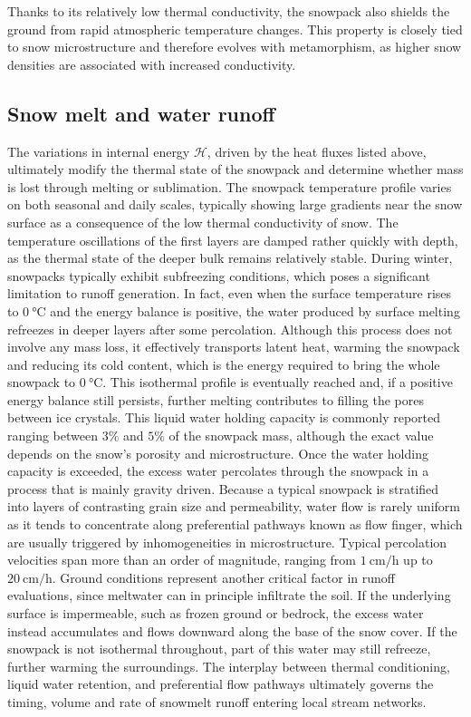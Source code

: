 Thanks to its relatively low thermal conductivity, the snowpack also shields the ground from rapid atmospheric temperature changes. This property is 
closely tied to snow microstructure and therefore evolves with metamorphism, as higher snow densities are associated with increased conductivity. 



\subsection{Snow melt and water runoff}

The variations in internal energy $\mathcal{H}$, driven by the heat fluxes listed above, ultimately modify the thermal state of the 
snowpack and determine whether mass is lost through melting or sublimation. The snowpack temperature profile varies on both seasonal and daily scales, 
typically showing large gradients near the snow surface as a consequence of the low thermal conductivity of snow. The temperature oscillations of 
the first layers are damped rather quickly with depth, as the thermal state of the deeper bulk remains relatively stable. During winter, snowpacks 
typically exhibit subfreezing conditions, which poses a significant limitation to runoff generation. In fact, even when the surface temperature rises 
to $\SI{0}{\degreeCelsius}$ and the energy balance is positive, the water produced by surface melting refreezes in deeper layers after some percolation. 
Although this process does not involve any mass loss, it effectively transports latent heat, warming the snowpack and reducing its cold content, which is 
the energy required to bring the whole snowpack to $\SI{0}{\degreeCelsius}$. This isothermal profile is eventually reached and, if a positive energy 
balance still persists, further melting contributes to filling the pores between ice crystals. This liquid water holding capacity is commonly reported 
ranging between $3\%$ and $5\%$ of the snowpack mass, although the exact value depends on the snow's porosity and microstructure. 
Once the water holding capacity is exceeded, the excess water percolates through the snowpack in a process that is 
mainly gravity driven. Because a typical snowpack is stratified into layers of contrasting grain size and permeability, water flow is rarely uniform 
as it tends to concentrate along preferential pathways known as flow finger, which are usually triggered by inhomogeneities in microstructure. 
Typical percolation velocities span more than an order of magnitude, ranging from $\SI{1}{\centi\meter\per\hour}$ 
up to $\SI{20}{\centi\meter\per\hour}$. Ground conditions represent another critical factor in runoff evaluations, since meltwater can in principle 
infiltrate the soil. If the underlying surface is impermeable, such as frozen ground or bedrock, the excess water instead accumulates and flows downward 
along the base of the snow cover. If the snowpack is not isothermal throughout, part of this water may still refreeze, further warming the surroundings. 
The interplay between thermal conditioning, liquid water retention, and preferential flow pathways ultimately governs the timing, volume and rate of 
snowmelt runoff entering local stream networks. 

